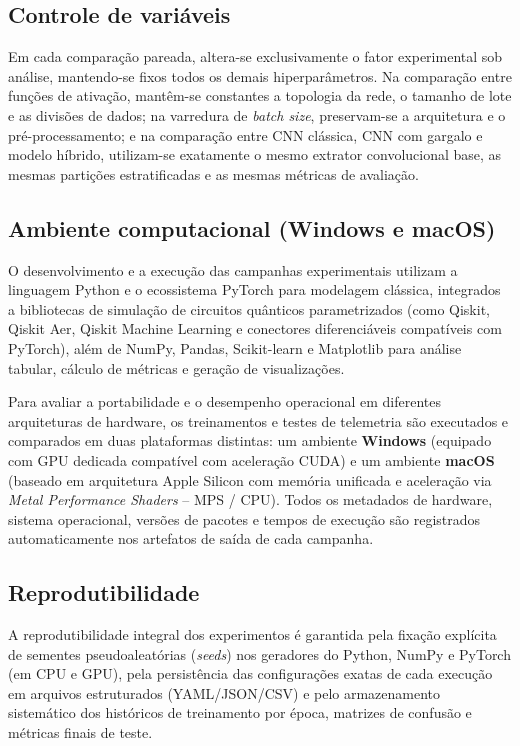 \documentclass[
    12pt,
    openright,
    oneside,
    a4paper,
    english,
    brazil
]{abntex2}
\begin{document}
\subsection{Controle de variáveis}

Em cada comparação pareada, altera-se exclusivamente o fator experimental sob análise, mantendo-se fixos todos os demais hiperparâmetros. Na comparação entre funções de ativação, mantêm-se constantes a topologia da rede, o tamanho de lote e as divisões de dados; na varredura de \textit{batch size}, preservam-se a arquitetura e o pré-processamento; e na comparação entre CNN clássica, CNN com gargalo e modelo híbrido, utilizam-se exatamente o mesmo extrator convolucional base, as mesmas partições estratificadas e as mesmas métricas de avaliação.

\subsection{Ambiente computacional (Windows e macOS)}
\label{subsec:tecnologias}

O desenvolvimento e a execução das campanhas experimentais utilizam a linguagem Python e o ecossistema PyTorch para modelagem clássica, integrados a bibliotecas de simulação de circuitos quânticos parametrizados (como Qiskit, Qiskit Aer, Qiskit Machine Learning e conectores diferenciáveis compatíveis com PyTorch), além de NumPy, Pandas, Scikit-learn e Matplotlib para análise tabular, cálculo de métricas e geração de visualizações.

Para avaliar a portabilidade e o desempenho operacional em diferentes arquiteturas de hardware, os treinamentos e testes de telemetria são executados e comparados em duas plataformas distintas: um ambiente \textbf{Windows} (equipado com GPU dedicada compatível com aceleração CUDA) e um ambiente \textbf{macOS} (baseado em arquitetura Apple Silicon com memória unificada e aceleração via \textit{Metal Performance Shaders} -- MPS / CPU). Todos os metadados de hardware, sistema operacional, versões de pacotes e tempos de execução são registrados automaticamente nos artefatos de saída de cada campanha.

\subsection{Reprodutibilidade}

A reprodutibilidade integral dos experimentos é garantida pela fixação explícita de sementes pseudoaleatórias (\textit{seeds}) nos geradores do Python, NumPy e PyTorch (em CPU e GPU), pela persistência das configurações exatas de cada execução em arquivos estruturados (YAML/JSON/CSV) e pelo armazenamento sistemático dos históricos de treinamento por época, matrizes de confusão e métricas finais de teste.
\end{document}
